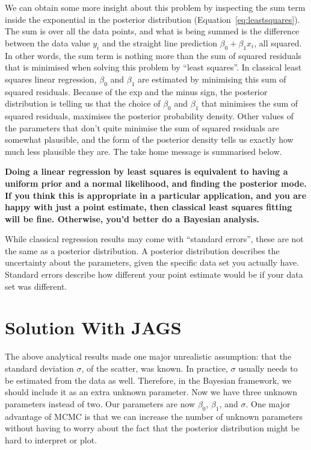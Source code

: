 We can obtain some more insight about this problem by inspecting the
sum term inside the exponential in the posterior distribution
(Equation~\ref{eq:leastsquares}). The sum is over all the data points, and
what is being summed is the difference between the data value $y_i$ and the
straight line prediction $\beta_0 + \beta_1 x_i$, all squared.
In other words, the sum term is nothing more than the sum of squared
residuals that is minimised when solving this problem by ``least squares''.
In classical least squares linear regression, $\beta_0$ and $\beta_1$ are
estimated by minimising this sum of squared residuals. Because of the exp and
the minus sign, the posterior distribution is telling us that the choice of
$\beta_0$ and $\beta_1$ that minimises the sum of squared residuals, maximises
the posterior probability density. Other values of the parameters that
don't quite minimise the sum of squared residuals are somewhat plausible, and
the form of the posterior density tells us exactly how much less plausible they
are. The take home message is summarised below.

\begin{framed}
{\bf Doing a linear regression by least squares is equivalent to having a
uniform prior and a normal likelihood, and finding the posterior mode.
If you think this is appropriate in a particular application, and you are happy
with just a point estimate, then classical
least squares fitting will be fine. Otherwise, you'd better do a Bayesian analysis.}
\end{framed}

While classical regression results may come with ``standard errors'', these are
not the same as a posterior distribution. A posterior distribution describes the
uncertainty about the parameters, given the specific data set you actually have.
Standard errors describe how different your point estimate would be if your data
set was different.

\section{Solution With JAGS}
The above analytical results made one major unrealistic assumption: that the standard
deviation $\sigma$, of the scatter, was known. In practice, $\sigma$ usually needs to be
estimated from the data as well. Therefore, in the Bayesian framework, we should
include it as an extra unknown parameter. Now we have three unknown parameters instead
of two. Our parameters are now $\beta_0$, $\beta_1$, and $\sigma$.
One major advantage of MCMC is that we can increase the number of unknown parameters
without having to worry about the fact that the posterior distribution might
be hard to interpret or plot.

